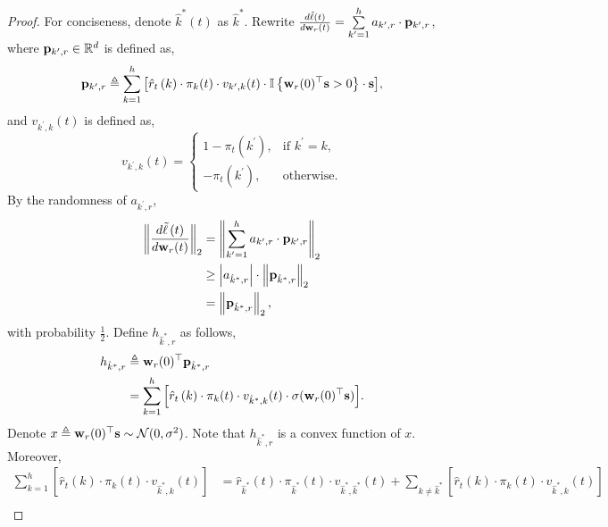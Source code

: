 \begin{proof}
	 For conciseness, denote $\hat{k}^*(t)$ as $\hat{k}^*$. Rewrite $\frac{d\tilde{\ell}\left(t\right)}{d {\mathbf{w}}_r(t)} = \sum\limits_{k^
	\prime=1}^{h}{ a_{k^\prime,r} \cdot {\mathbf{p}}_{k^\prime, r} }$, where ${\mathbf{p}}_{k^\prime, r} \in {\mathbb{R}}^d$ is defined as, 
\begin{equation*}
	{\mathbf{p}}_{k^\prime, r} \triangleq \sum\limits_{k=1}^{h}{ \left[ \hat{r}_{t}\left(k\right) \cdot \pi_{k}(t) \cdot v_{k^\prime,k}(t) \cdot {\mathbb{I}}\left\{ {\mathbf{w}}_r(0)^\top {\mathbf{s}} > 0 \right\} \cdot {\mathbf{s}} \right] },
\end{equation*}
and $v_{k^\prime,k}(t)$ is defined as,
\begin{equation*}
	v_{k^\prime,k}(t) = \begin{cases}
    1 - \pi_{t}\left(k^\prime\right), & \text{if $k^\prime = k$}, \\
    - \pi_{t}\left(k^\prime\right), & \text{otherwise}.
  \end{cases}
\end{equation*}
By the randomness of $a_{k^\prime,r}$,
\begin{equation}
\label{eq:gradient_p_lowerbound}
\begin{split}
	\left\| \frac{d\tilde{\ell}\left(t\right)}{d {\mathbf{w}}_r(t)} \right\|_2 &= \left\| \sum\limits_{k^
	\prime=1}^{h}{ a_{k^\prime,r} \cdot {\mathbf{p}}_{k^\prime, r} } \right\|_2 \\
	&\ge \left| a_{\hat{k}^*,r} \right| \cdot \left\| {\mathbf{p}}_{\hat{k}^*, r}\right\|_2 \\
	&= \left\| {\mathbf{p}}_{\hat{k}^*, r}\right\|_2,
\end{split}
\end{equation}
with probability $\frac{1}{2}$. Define $h_{\hat{k}^*,r}$ as follows,
\begin{equation}
\label{eq:h_auxiliary}
\begin{split}
	h_{\hat{k}^*,r} &\triangleq {\mathbf{w}}_r(0)^\top {\mathbf{p}}_{\hat{k}^*, r} \\
	&=  \sum\limits_{k=1}^{h}{ \left[ \hat{r}_{t}\left(k\right) \cdot \pi_{k}(t) \cdot v_{\hat{k}^*,k}(t) \cdot \sigma( {\mathbf{w}}_r(0)^\top {\mathbf{s}} ) \right] }.
\end{split}
\end{equation}
Denote $x \triangleq {\mathbf{w}}_r(0)^\top {\mathbf{s}} \sim {\mathcal{N}}(0, \sigma^2)$. Note that $h_{\hat{k}^*,r}$ is a convex function of $x$. Moreover,
\begin{equation*}
\begin{split}
	\sum\limits_{k=1}^{h}{ \left[ \hat{r}_{t}\left(k\right) \cdot \pi_{k}(t) \cdot v_{\hat{k}^*,k}(t) \right] } &= \hat{r}_{\hat{k}^*}\left(t\right) \cdot \pi_{\hat{k}^*}(t) \cdot v_{\hat{k}^*,\hat{k}^*}(t) + \sum\limits_{k\not=\hat{k}^*}{ \left[ \hat{r}_{t}\left(k\right) \cdot \pi_{k}(t) \cdot v_{\hat{k}^*,k}(t) \right] } \\

\end{split}
\end{equation*}
\end{proof}
